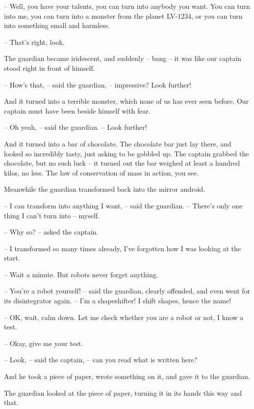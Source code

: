 \documentclass[ebook,oneside,final,openright]{memoir}
\begin{document}
– Well, you have your talents, you can turn into anybody you want. You can turn into me, you can turn into a monster from the planet LV-1234, or you can turn into something small and harmless.\par
– That’s right, look.\par
\par
The guardian became iridescent, and suddenly – bang – it was like our captain stood right in front of himself.\par
– How’s that, – said the guardian, – impressive? Look further!\par
And it turned into a terrible monster, which none of us has ever seen before. Our captain must have been beside himself with fear.\par
– Oh yeah, – said the guardian. – Look further!\par
\par
And it turned into a bar of chocolate. The chocolate bar just lay there, and looked so incredibly tasty, just asking to be gobbled up. The captain grabbed the chocolate, but no such luck – it turned out the bar weighed at least a hundred kilos, no less. The law of conservation of mass in action, you see.\par
\par
Meanwhile the guardian transformed back into the mirror android.\par
– I can transform into anything I want, – said the guardian. – There’s only one thing I can’t turn into – myself.\par
– Why so? – asked the captain.\par
– I transformed so many times already, I’ve forgotten how I was looking at the start.\par
– Wait a minute. But robots never forget anything.\par
– You’re a robot yourself! – said the guardian, clearly offended, and even went for its disintegrator again. – I’m a shapeshifter! I shift shapes, hence the name!\par
– OK, wait, calm down. Let me check whether you are a robot or not, I know a test.\par
– Okay, give me your test.\par
– Look, – said the captain, – can you read what is written here?\par
And he took a piece of paper, wrote something on it, and gave it to the guardian.\par
The guardian looked at the piece of paper, turning it in its hands this way and that.\par
\end{document}
